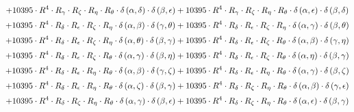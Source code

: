 \begin{subequations}
\begin{gather}
 \\[0.2em] \notag 		 + 10395 \cdot R^{4} \cdot R_{\gamma{}} \cdot R_{\zeta{}} \cdot R_{\eta{}} \cdot R_{\theta{}} \cdot \delta{}\left(\alpha{}, \delta{}\right) \cdot \delta{}\left(\beta{}, \epsilon{}\right)+ 10395 \cdot R^{4} \cdot R_{\gamma{}} \cdot R_{\zeta{}} \cdot R_{\eta{}} \cdot R_{\theta{}} \cdot \delta{}\left(\alpha{}, \epsilon{}\right) \cdot \delta{}\left(\beta{}, \delta{}\right) 
 \\[0.2em] \notag 		 + 10395 \cdot R^{4} \cdot R_{\delta{}} \cdot R_{\epsilon{}} \cdot R_{\zeta{}} \cdot R_{\eta{}} \cdot \delta{}\left(\alpha{}, \beta{}\right) \cdot \delta{}\left(\gamma{}, \theta{}\right)+ 10395 \cdot R^{4} \cdot R_{\delta{}} \cdot R_{\epsilon{}} \cdot R_{\zeta{}} \cdot R_{\eta{}} \cdot \delta{}\left(\alpha{}, \gamma{}\right) \cdot \delta{}\left(\beta{}, \theta{}\right) 
 \\[0.2em] \notag 		 + 10395 \cdot R^{4} \cdot R_{\delta{}} \cdot R_{\epsilon{}} \cdot R_{\zeta{}} \cdot R_{\eta{}} \cdot \delta{}\left(\alpha{}, \theta{}\right) \cdot \delta{}\left(\beta{}, \gamma{}\right)+ 10395 \cdot R^{4} \cdot R_{\delta{}} \cdot R_{\epsilon{}} \cdot R_{\zeta{}} \cdot R_{\theta{}} \cdot \delta{}\left(\alpha{}, \beta{}\right) \cdot \delta{}\left(\gamma{}, \eta{}\right) 
 \\[0.2em] \notag 		 + 10395 \cdot R^{4} \cdot R_{\delta{}} \cdot R_{\epsilon{}} \cdot R_{\zeta{}} \cdot R_{\theta{}} \cdot \delta{}\left(\alpha{}, \gamma{}\right) \cdot \delta{}\left(\beta{}, \eta{}\right)+ 10395 \cdot R^{4} \cdot R_{\delta{}} \cdot R_{\epsilon{}} \cdot R_{\zeta{}} \cdot R_{\theta{}} \cdot \delta{}\left(\alpha{}, \eta{}\right) \cdot \delta{}\left(\beta{}, \gamma{}\right) 
 \\[0.2em] \notag 		 + 10395 \cdot R^{4} \cdot R_{\delta{}} \cdot R_{\epsilon{}} \cdot R_{\eta{}} \cdot R_{\theta{}} \cdot \delta{}\left(\alpha{}, \beta{}\right) \cdot \delta{}\left(\gamma{}, \zeta{}\right)+ 10395 \cdot R^{4} \cdot R_{\delta{}} \cdot R_{\epsilon{}} \cdot R_{\eta{}} \cdot R_{\theta{}} \cdot \delta{}\left(\alpha{}, \gamma{}\right) \cdot \delta{}\left(\beta{}, \zeta{}\right) 
 \\[0.2em] \notag 		 + 10395 \cdot R^{4} \cdot R_{\delta{}} \cdot R_{\epsilon{}} \cdot R_{\eta{}} \cdot R_{\theta{}} \cdot \delta{}\left(\alpha{}, \zeta{}\right) \cdot \delta{}\left(\beta{}, \gamma{}\right)+ 10395 \cdot R^{4} \cdot R_{\delta{}} \cdot R_{\zeta{}} \cdot R_{\eta{}} \cdot R_{\theta{}} \cdot \delta{}\left(\alpha{}, \beta{}\right) \cdot \delta{}\left(\gamma{}, \epsilon{}\right) 
 \\[0.2em] \notag 		 + 10395 \cdot R^{4} \cdot R_{\delta{}} \cdot R_{\zeta{}} \cdot R_{\eta{}} \cdot R_{\theta{}} \cdot \delta{}\left(\alpha{}, \gamma{}\right) \cdot \delta{}\left(\beta{}, \epsilon{}\right)+ 10395 \cdot R^{4} \cdot R_{\delta{}} \cdot R_{\zeta{}} \cdot R_{\eta{}} \cdot R_{\theta{}} \cdot \delta{}\left(\alpha{}, \epsilon{}\right) \cdot \delta{}\left(\beta{}, \gamma{}\right) 

\end{gather}
\end{subequations}
